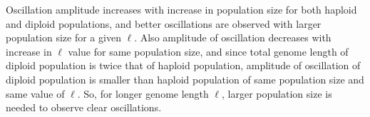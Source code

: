Oscillation amplitude increases with increase in population size for both haploid and diploid populations, 
and better oscillations are observed with larger population size for a given $\ell$. 
Also amplitude of oscillation decreases with increase in $\ell$ value for same population size, 
and since total genome length of diploid population is twice that of haploid population, 
amplitude of oscillation of diploid population is smaller than haploid population of same population size and same value of $\ell$. 
So, for longer genome length $\ell$, larger population size is needed to observe clear oscillations.

\begin{figure}[h]
\begin{center}
 \vspace{-0.5em} 


\end{center}
\end{figure}
